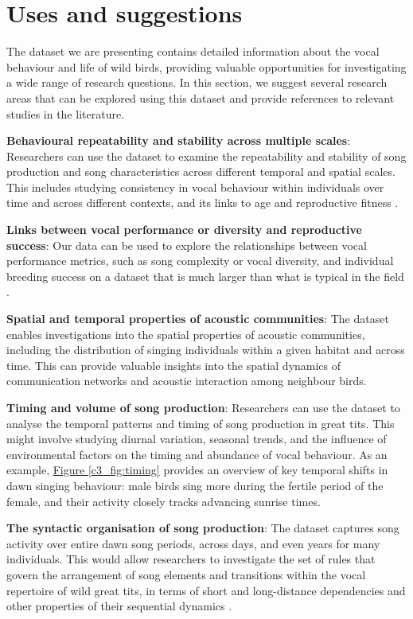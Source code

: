 \section{Uses and suggestions}

The dataset we are presenting contains detailed information about the vocal behaviour and life of wild birds, providing valuable opportunities for investigating a wide range of research questions. In this section, we suggest several research areas that can be explored using this dataset and provide references to relevant studies in the literature.

\textbf{Behavioural repeatability and stability across multiple scales}: Researchers can use the dataset to examine the repeatability and stability of song production and song characteristics across different temporal and spatial scales. This includes studying consistency in vocal behaviour within individuals over time and across different contexts, and its links to age \parencite{rivera-gutierrez2012, zipple2019} and reproductive fitness \parencite{sierro2023}.

\textbf{Links between vocal performance or diversity and reproductive success}: Our data can be used to explore the relationships between vocal performance metrics, such as song complexity or vocal diversity, and individual breeding success on a dataset that is much larger than what is typical in the field \parencite{hutfluss2022, beecher2020a, crates2021, hiebert1989, mcgregor1981}. 

\textbf{Spatial and temporal properties of acoustic communities}: The dataset enables investigations into the spatial properties of acoustic communities, including the distribution of singing individuals within a given habitat and across time. This can provide valuable insights into the spatial dynamics of communication networks and acoustic interaction among neighbour birds.

\textbf{Timing and volume of song production}: Researchers can use the dataset to analyse the temporal patterns and timing of song production in great tits. This might involve studying diurnal variation, seasonal trends, and the influence of environmental factors on the timing and abundance of vocal behaviour. As an example, \hyperref[c3_fig:timing]{Figure \ref*{c3_fig:timing}} provides an overview of key temporal shifts in dawn singing behaviour: male birds sing more during the fertile period of the female, and their activity closely tracks advancing sunrise times.

\textbf{The syntactic organisation of song production}: The dataset captures song activity over entire dawn song periods, across days, and even years for many individuals. This would allow researchers to investigate the set of rules that govern the arrangement of song elements and transitions within the vocal repertoire of wild great tits, in terms of short and long-distance dependencies and other properties of their sequential dynamics \parencite{hedley2018, lachlan2010, sainburg2019, searcy2022}.

